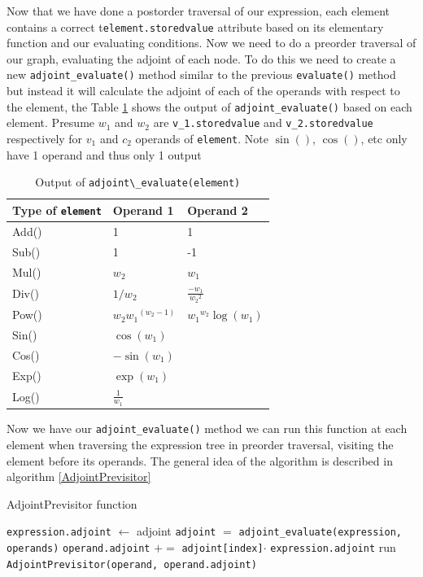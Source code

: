 \documentclass{article}
\begin{document}
Now that we have done a postorder traversal of our expression, each element contains a correct t\verb|element.storedvalue| attribute based on its elementary function and our evaluating conditions. Now we need to do a preorder traversal of our graph, evaluating the adjoint of each node. To do this we need to create a new \verb|adjoint_evaluate()| method similar to the previous \verb|evaluate()| method but instead it will calculate the adjoint of each of the operands with respect to the element, the Table \ref{tab:AdjEval} shows the output of \verb|adjoint_evaluate()| based on each element. Presume $w_1$ and $w_2$ are \verb|v_1.storedvalue| and \verb|v_2.storedvalue| respectively for $v_1$ and $c_2$ operands of \verb|element|. Note $\sin()$, $\cos()$, etc only have 1 operand and thus only 1 output

\begin{table}[h!]
    \centering
    \begin{tabular}{|lll|}
        \hline
        Type of \verb|element| & Operand 1  & Operand 2 \\
        \hline
        Add() & 1 & 1 \\
        Sub() & 1 & -1 \\
        Mul() & $w_2$ & $w_1$ \\
        Div() & $1/w_2$ & $\frac{-w_1}{{w_2}^2}$ \\
        Pow() & $w_2{w_1}^{(w_2-1)}$ & ${w_1}^{w_2}\log(w_1)$ \\
        Sin() & $\cos(w_1)$ &  \\
        Cos() & $-\sin(w_1)$ &  \\
        Exp() & $\exp(w_1)$ &  \\
        Log() & $\frac{1}{w_1}$ &  \\
        \hline
    \end{tabular}
    \caption{Output of \verb|adjoint\_evaluate(element)|}
    \label{tab:AdjEval}
\end{table}

Now we have our \verb|adjoint_evaluate()| method we can run this function at each element when traversing the expression tree in preorder traversal, visiting the element before its operands. The general idea of the algorithm is described in algorithm \ref{AdjointPrevisitor}

\begin{algorithm}[h]
\caption{AdjointPrevisitor function}\label{AdjointPrevisitor}
\begin{algorithmic}[1]
\State \verb|expression.adjoint| $\gets$ adjoint
\State \verb|adjoint| $=$ \verb|adjoint_evaluate(expression, operands)|
\State \verb|operand.adjoint| $+=$ \verb|adjoint[index]|$\cdot$ \verb|expression.adjoint|
\State run \verb|AdjointPrevisitor(operand, operand.adjoint)|
\EndFor
\EndProcedure
\end{algorithmic}
\end{algorithm}
\end{document}
